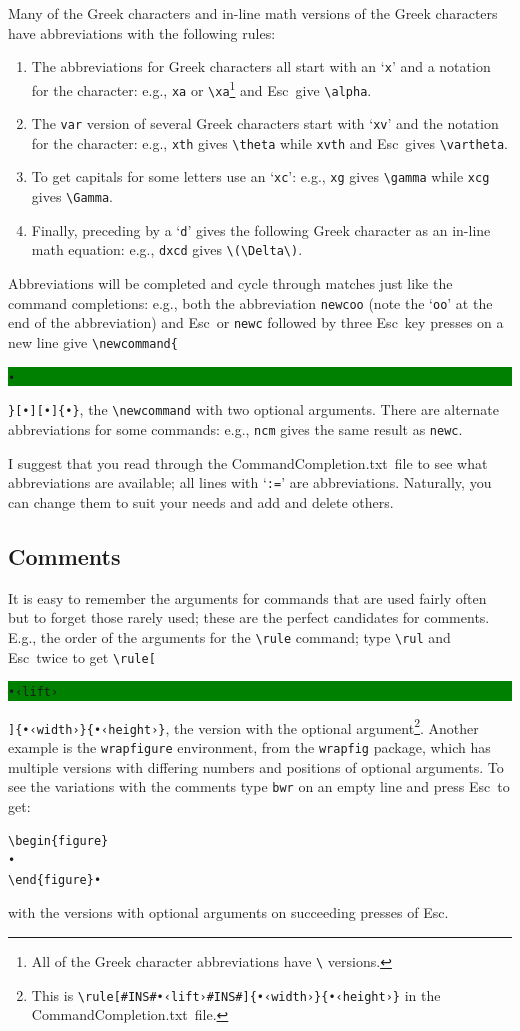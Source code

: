 \documentclass[11pt]{article}
\newcommand{\esckey}{\textsf{Esc}}
\newcommand{\selmark}{\colorbox{green}{\rule[-0.5ex]{0ex}{2.1ex}\texttt{•}}}
\newcommand{\selcomrule}{\colorbox{green}{\rule[-0.5ex]{0ex}{2.1ex}\texttt{•‹lift›}}}
\newcommand{\CCT}{\textsf{CommandCompletion.txt}}
\begin{document}
Many of the Greek characters and in-line math versions of the Greek characters have abbreviations with the following rules:
\begin{enumerate}
\item
The abbreviations for Greek characters all start with an `\texttt{x}' and a notation for the character: e.g., \verb|xa| or \verb|\xa|\footnote{All of the Greek character abbreviations have \texttt{\textbackslash} versions.} and \esckey\ give \verb|\alpha|. 
\item
The \texttt{var} version of several Greek characters start with `\texttt{xv}' and the notation for the character: e.g., \texttt{xth} gives \verb|\theta| while \verb|xvth| and \esckey\ gives \verb|\vartheta|.
\item
To get capitals for some letters use an `\texttt{xc}': e.g., \verb|xg| gives \verb|\gamma| while \verb|xcg| gives \verb|\Gamma|.
\item
Finally, preceding by a `\texttt{d}' gives the following Greek character as an in-line math equation: e.g., \verb|dxcd| gives \verb|\(\Delta\)|.
\end{enumerate}

Abbreviations will be completed and cycle through matches just like the command completions: e.g., both the abbreviation \texttt{newcoo} (note the `\texttt{oo}' at the end of the abbreviation) and \esckey\ or \texttt{newc} followed by three \esckey\ key presses on a new line give \verb|\newcommand{|\selmark\verb|}[•][•]{•}|, the \verb|\newcommand| with two optional arguments. There are alternate abbreviations for some commands: e.g., \texttt{ncm} gives the same result as \texttt{newc}.

I suggest that you read through the \CCT\ file to see what abbreviations are available; all lines with `\kern-1.7pt\texttt{:=}' are abbreviations. Naturally, you can change them to suit your needs and add and delete others.

\subsection*{Comments}

It is easy to remember the arguments for commands that are used fairly often but to forget those rarely used; these are the perfect candidates for comments. E.g., the order of the arguments for the \verb|\rule| command; type \verb|\rul| and \esckey\ twice to get \verb|\rule[|\selcomrule\verb|]{•‹width›}{•‹height›}|, the version with the optional argument\footnote{This is \texttt{\textbackslash rule[\#INS\#•‹lift›\#INS\#]\{•‹width›\}\{•‹height›\}} in the \CCT\ file.}. Another example is the \texttt{wrapfigure} environment, from the \texttt{wrapfig} package, which has multiple versions with differing numbers and positions of optional arguments. To see the variations with the comments type \texttt{bwr} on an empty line and press \esckey\ to get:
\begin{verbatim}
\begin{figure}
•
\end{figure}•
\end{verbatim}
with the versions with optional arguments on succeeding presses of \esckey.
\end{document}
